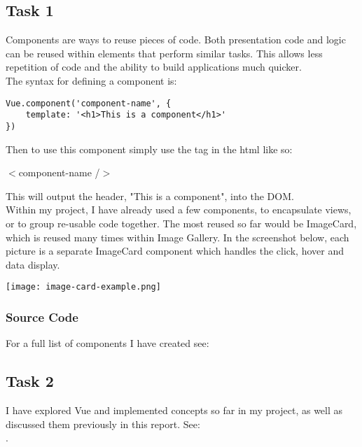 \documentclass[portfolio.tex]{subfiles}
\begin{document}
			\subsection{Task 1}
				Components are ways to reuse pieces of code. Both presentation code and logic can be reused within elements that perform similar tasks. This allows less repetition of code and the ability to build applications much quicker.\\

				The syntax for defining a component is:\\
				\label{global-registration}
				\begin{lstlisting}
Vue.component('component-name', {
	template: '<h1>This is a component</h1>'
})
				\end{lstlisting}

				\vspace{0.5cm} \noindent Then to use this component simply use the tag in the html like so:\\

				\begin{center}
					$<$component-name /$>$
				\end{center}

				\vspace{0.5cm} \noindent This will output the header, "This is a component", into the DOM.\\

				Within my project, I have already used a few components, to encapsulate views, or to group re-usable code together. The most reused so far would be ImageCard, which is reused many times within Image Gallery. In the screenshot below, each picture is a separate ImageCard component which handles the click, hover and data display.

				\begin{center}
					\texttt{[image: image-card-example.png]}
				\end{center}


				\subsubsection{Source Code}
					\noindent For a full list of components I have created see:  \\

			\subsection{Task 2}
				I have explored Vue and implemented concepts so far in my project, as well as discussed them previously in this report. See:
				\\ .
\end{document}
